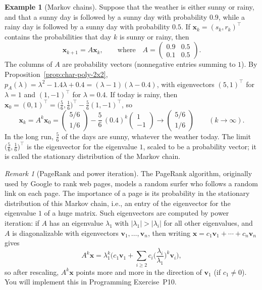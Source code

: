\documentclass[11pt]{article}
\theoremstyle{definition}
\newtheorem{example}[definition]{Example}
\theoremstyle{plain}
\theoremstyle{remark}
\newtheorem{remark}[definition]{Remark}
\begin{document}
\begin{example}[Markov chains]\label{ex:markov}
    Suppose that the weather is either sunny or rainy, and that a sunny day is followed by a sunny day with probability $0.9$, while a rainy day is followed by a sunny day with probability $0.5$. If $\mathbf{x}_k = (s_k, r_k)^\top$ contains the probabilities that day $k$ is sunny or rainy, then
    \[\mathbf{x}_{k+1} = A \mathbf{x}_k, \qquad \text{where} \quad A = \begin{pmatrix} 0.9 & 0.5 \\ 0.1 & 0.5 \end{pmatrix}.\]
    The columns of $A$ are probability vectors (nonnegative entries summing to $1$). By Proposition~\ref{prop:char-poly-2x2}, $p_A(\lambda) = \lambda^2 - 1.4\lambda + 0.4 = (\lambda - 1)(\lambda - 0.4)$, with eigenvectors $(5, 1)^\top$ for $\lambda = 1$ and $(1, -1)^\top$ for $\lambda = 0.4$. If today is rainy, then $\mathbf{x}_0 = (0, 1)^\top = \big(\frac{5}{6}, \frac{1}{6}\big)^\top - \frac{5}{6}(1, -1)^\top$, so
    \[\mathbf{x}_k = A^k \mathbf{x}_0 = \begin{pmatrix} 5/6 \\ 1/6 \end{pmatrix} - \frac{5}{6}\, (0.4)^k \begin{pmatrix} 1 \\ -1 \end{pmatrix} \longrightarrow \begin{pmatrix} 5/6 \\ 1/6 \end{pmatrix} \qquad (k \to \infty).\]
    In the long run, $\frac{5}{6}$ of the days are sunny, whatever the weather today. The limit $\big(\frac{5}{6}, \frac{1}{6}\big)^\top$ is the eigenvector for the eigenvalue $1$, scaled to be a probability vector; it is called the stationary distribution of the Markov chain.
\end{example}

\begin{remark}[PageRank and power iteration]
    The PageRank algorithm, originally used by Google to rank web pages, models a random surfer who follows a random link on each page. The importance of a page is its probability in the stationary distribution of this Markov chain, i.e., an entry of the eigenvector for the eigenvalue $1$ of a huge matrix. Such eigenvectors are computed by power iteration: if $A$ has an eigenvalue $\lambda_1$ with $|\lambda_1| > |\lambda_i|$ for all other eigenvalues, and $A$ is diagonalizable with eigenvectors $\mathbf{v}_1, \ldots, \mathbf{v}_n$, then writing $\mathbf{x} = c_1 \mathbf{v}_1 + \cdots + c_n \mathbf{v}_n$ gives
    \[A^k \mathbf{x} = \lambda_1^k \Big(c_1 \mathbf{v}_1 + \sum_{i \geq 2} c_i \Big(\frac{\lambda_i}{\lambda_1}\Big)^k \mathbf{v}_i\Big),\]
    so after rescaling, $A^k \mathbf{x}$ points more and more in the direction of $\mathbf{v}_1$ (if $c_1 \neq 0$). You will implement this in Programming Exercise~P10.
\end{remark}
\end{document}
